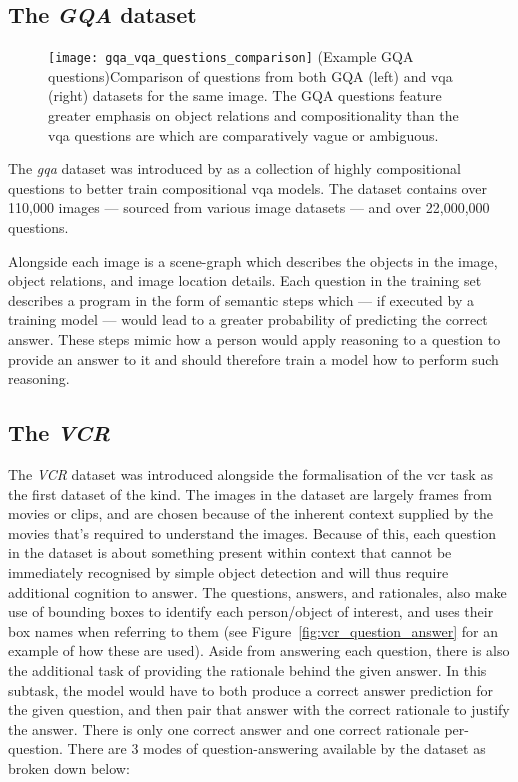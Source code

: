 \subsection{The \textit{GQA} dataset}
\label{subsec:gqa_dataset}

\begin{figure}[htbp]
    \centering
    \texttt{[image: gqa\_vqa\_questions\_comparison]}
    \captionsource(Example GQA questions){Comparison of questions from both GQA (left) and \gls{vqa} (right) datasets for the same image. The GQA questions feature greater emphasis on object relations and compositionality than the \gls{vqa} questions are which are comparatively vague or ambiguous. \label{fig:gqa_and_vqa_questions_compared}}{\citeauthor{hudson_gqa_2019}\cite{hudson_gqa_2019}}
\end{figure}

The \textit{\gls{gqa}} dataset was introduced by \citeauthor{hudson_gqa_2019}\cite{hudson_gqa_2019} as a collection of highly compositional questions to better train compositional \gls{vqa} models.
The dataset contains over 110,000 images --- sourced from various image datasets --- and over 22,000,000 questions.

Alongside each image is a scene-graph which describes the objects in the image, object relations, and image location details.
Each question in the training set describes a program in the form of semantic steps which --- if executed by a training model --- would lead to a greater probability of predicting the correct answer.
These steps mimic how a person would apply reasoning to a question to provide an answer to it and should therefore train a model how to perform such reasoning.

\subsection{The \textit{VCR}}
\label{subsec:vcr_dataset}

The \textit{VCR} dataset \cite{zellers_recognition_2019} was introduced alongside the formalisation of the \gls{vcr} task as the first dataset of the kind.
The images in the dataset are largely frames from movies or clips, and are chosen because of the inherent context supplied by the movies that's required to understand the images.
Because of this, each question in the dataset is about something present within context that cannot be immediately recognised by simple object detection and will thus require additional cognition to answer.
The questions, answers, and rationales, also make use of bounding boxes to identify each person/object of interest, and uses their box names when referring to them (see Figure~\ref{fig:vcr_question_answer} for an example of how these are used).
Aside from answering each question, there is also the additional task of providing the rationale behind the given answer.
In this subtask, the model would have to both produce a correct answer prediction for the given question, and then pair that answer with the correct rationale to justify the answer.
There is only one correct answer and one correct rationale per-question.
There are 3 modes of question-answering available by the dataset as broken down below:

